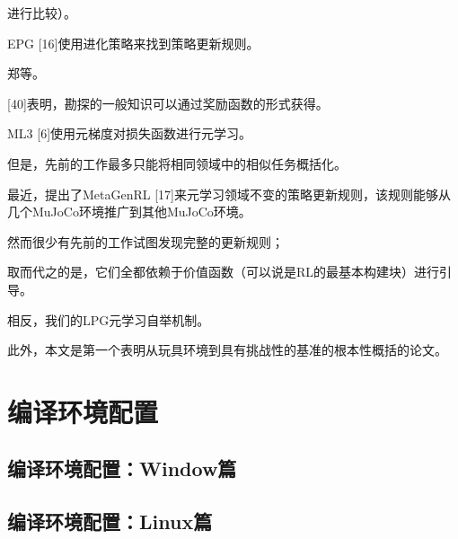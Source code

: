 进行比较）。 

EPG [16]使用进化策略来找到策略更新规则。

郑等。 

[40]表明，勘探的一般知识可以通过奖励函数的形式获得。 

ML3 [6]使用元梯度对损失函数进行元学习。

但是，先前的工作最多只能将相同领域中的相似任务概括化。

最近，提出了MetaGenRL [17]来元学习领域不变的策略更新规则，该规则能够从几个MuJoCo环境推广到其他MuJoCo环境。

然而很少有先前的工作试图发现完整的更新规则；

取而代之的是，它们全都依赖于价值函数（可以说是RL的最基本构建块）进行引导。

相反，我们的LPG元学习自举机制。

此外，本文是第一个表明从玩具环境到具有挑战性的基准的根本性概括的论文。

\section{编译环境配置}


\subsection{编译环境配置：Window篇}


\subsection{编译环境配置：Linux篇}





